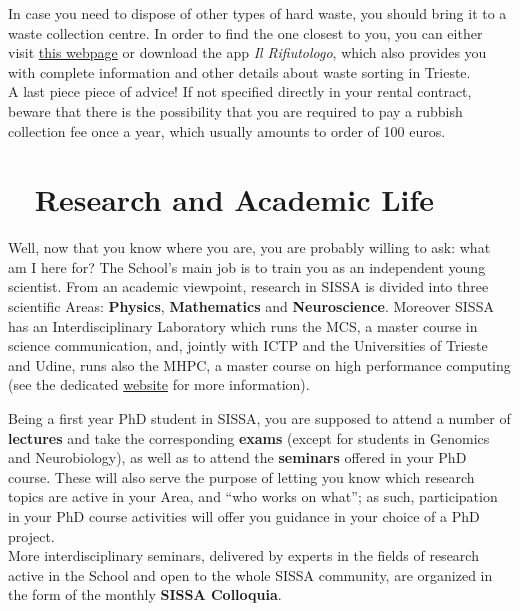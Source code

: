 \documentclass{sissavademecum}
\begin{document}
In case you need to dispose of other types of hard waste, you should bring it to a waste collection centre. In order to find the one closest to you, you can either visit \href{https://www.acegasapsamga.it/clienti/casa/casa_servizio_ambiente/casa_aaa_ambiente_centri_raccolta/32424.html}{this webpage} or download the app \textit{Il Rifiutologo}, which also provides you with complete information and other details about waste sorting in Trieste. \\
A last piece piece of advice! If not specified directly in your rental contract, beware that there is the possibility that you are required to pay a rubbish collection fee once a year, which usually amounts to order of 100 euros.



\chapter{\texorpdfstring{\faGraduationCap\ }{} Research and Academic Life}

Well, now that you know where you are, you are probably willing to ask: what am I here for? The School's main job is to train you as an independent young scientist. From an academic viewpoint, research in SISSA is divided into three scientific Areas: \textbf{Physics}, \textbf{Mathematics} and \textbf{Neuroscience}. Moreover SISSA has an Interdisciplinary Laboratory which runs the MCS, a master course in science communication, and, jointly with ICTP and the Universities of Trieste and Udine, runs also the MHPC, a master course on high performance computing (see the dedicated \href{https://www.sissa.it/ilas/}{website} for more information).

Being a first year PhD student in SISSA, you are supposed to attend a number of\textbf{ lectures }and take the corresponding \textbf{exams} (except for students in Genomics and Neurobiology), as well as to attend the \textbf{seminars} offered in your PhD course. These will also serve the purpose of letting you know which research topics are active in your Area, and ``who works on what''; as such, participation in your PhD course activities will offer you guidance in your choice of a PhD project.\\
More interdisciplinary seminars, delivered by experts in the fields of research active in the School and open to the whole SISSA community, are organized in the form of the monthly \textbf{SISSA Colloquia}.
\end{document}

